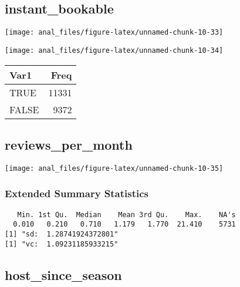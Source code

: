 \pagebreak

\hypertarget{instant_bookable}{%
\subsection{instant\_bookable}\label{instant_bookable}}

\begin{center}\texttt{[image: anal\_files/figure-latex/unnamed-chunk-10-33]} \end{center}

\begin{center}\texttt{[image: anal\_files/figure-latex/unnamed-chunk-10-34]} \end{center}

\begin{table}[H]
\centering
\begin{tabular}[t]{lr}
\toprule
Var1 & Freq\\
\midrule
TRUE & 11331\\
FALSE & 9372\\
\bottomrule
\end{tabular}
\end{table}
\pagebreak

\hypertarget{reviews_per_month}{%
\subsection{reviews\_per\_month}\label{reviews_per_month}}

\begin{center}\texttt{[image: anal\_files/figure-latex/unnamed-chunk-10-35]} \end{center}

\hypertarget{extended-summary-statistics-19}{%
\subsubsection{Extended Summary
Statistics}\label{extended-summary-statistics-19}}

\begin{verbatim}   Min. 1st Qu.  Median    Mean 3rd Qu.    Max.    NA's 
  0.010   0.210   0.710   1.179   1.770  21.410    5731 
[1] "sd:  1.28741924372801"
[1] "vc:  1.09231185933215"
\end{verbatim}

\pagebreak

\hypertarget{host_since_season}{%
\subsection{host\_since\_season}\label{host_since_season}}

